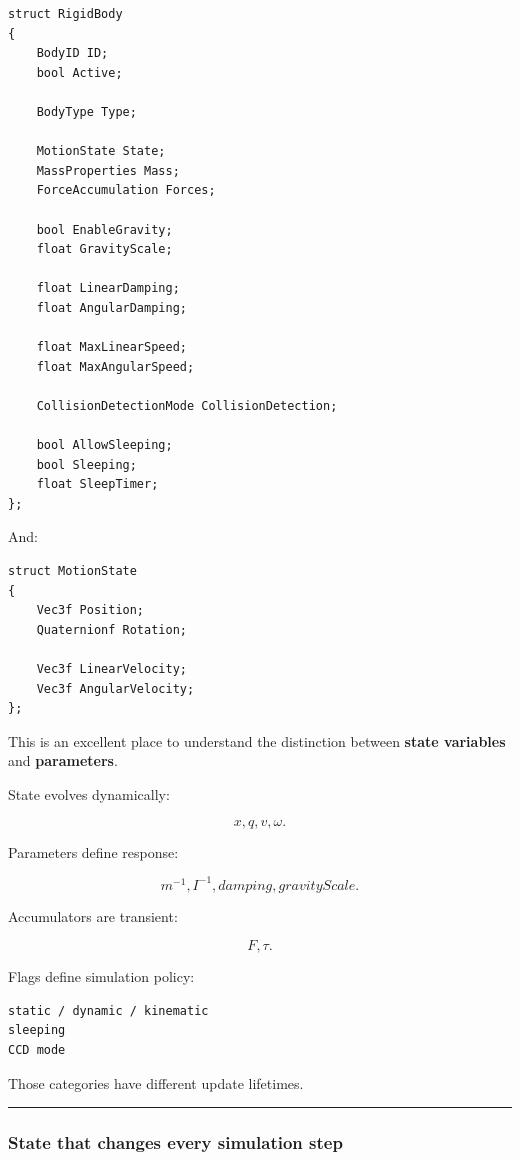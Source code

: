 \begin{verbatim}
struct RigidBody
{
    BodyID ID;
    bool Active;

    BodyType Type;

    MotionState State;
    MassProperties Mass;
    ForceAccumulation Forces;

    bool EnableGravity;
    float GravityScale;

    float LinearDamping;
    float AngularDamping;

    float MaxLinearSpeed;
    float MaxAngularSpeed;

    CollisionDetectionMode CollisionDetection;

    bool AllowSleeping;
    bool Sleeping;
    float SleepTimer;
};
\end{verbatim}

And:

\begin{verbatim}
struct MotionState
{
    Vec3f Position;
    Quaternionf Rotation;

    Vec3f LinearVelocity;
    Vec3f AngularVelocity;
};
\end{verbatim}

This is an excellent place to understand the distinction between \textbf{state variables} and \textbf{parameters}.

State evolves dynamically:

\[
x,q,v,\omega.
\]

Parameters define response:

\[
m^{-1},I^{-1},damping,gravityScale.
\]

Accumulators are transient:

\[
F,\tau.
\]

Flags define simulation policy:

\begin{verbatim}
static / dynamic / kinematic
sleeping
CCD mode
\end{verbatim}

Those categories have different update lifetimes.

\begin{center}\rule{0.5\linewidth}{0.5pt}\end{center}

\subsubsection{State that changes every simulation step}\label{state-that-changes-every-simulation-step}

